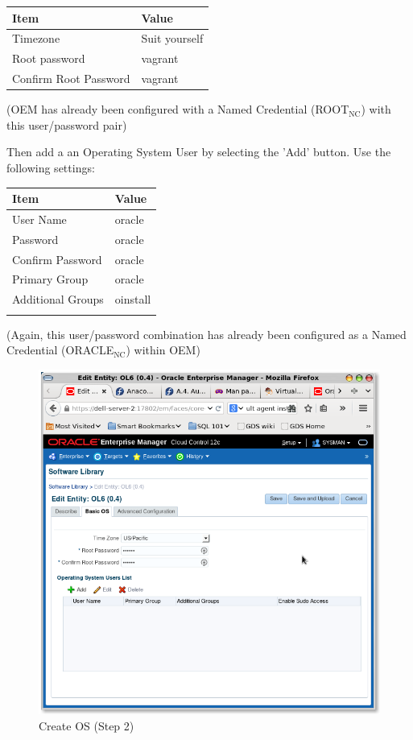 \documentclass[11pt]{article}
\begin{document}
\begin{center}
\begin{tabular}{ll}
Item & Value\\
\hline
Timezone & Suit yourself\\
Root password & vagrant\\
Confirm Root Password & vagrant\\
\end{tabular}
\end{center}

(OEM has already been configured with a Named Credential (ROOT$_{\text{NC}}$) with this user/password pair)

Then add a an Operating System User by selecting the 'Add' button. Use the following settings:

\begin{center}
\begin{tabular}{ll}
Item & Value\\
\hline
User Name & oracle\\
Password & oracle\\
Confirm Password & oracle\\
Primary Group & oracle\\
Additional Groups & oinstall\\
 & \\
\end{tabular}
\end{center}

(Again, this user/password combination has already been configured as a Named Credential (ORACLE$_{\text{NC}}$) within OEM)
\begin{figure}[htb]
\centering
\includegraphics[width=.9\linewidth]{./images/Create_OS_2.png}
\caption{Create OS (Step 2)}
\end{figure}
\clearpage
\end{document}
